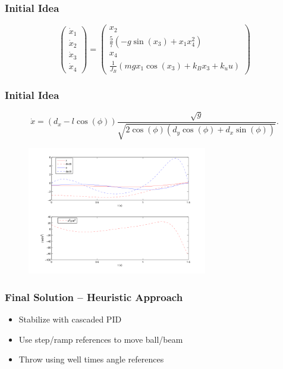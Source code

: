 \documentclass[
compress]
{beamer}
\begin{document}
\begin{frame}
\frametitle{Initial Idea}

\begin{equation*}
\begin{pmatrix}
\dot{x}_{1}\\
\dot{x}_{2}\\
\dot{x}_{3}\\
\dot{x}_{4}
\end{pmatrix}=\begin{pmatrix}x_{2}\\
\frac{5}{7}\left(-g\sin(x_{3})+x_{1}x_{4}^{2}\right)\\
x_{4}\\
\frac{1}{J_B}(mgx_{1}\cos(x_3)+k_Bx_3+k_{u}u)
\end{pmatrix}
\end{equation*}
\begin{figure}
\centering
\scalebox{0.7}{}
\end{figure}
\end{frame}

\begin{frame}
\frametitle{Initial Idea}
\[
\dot{x}=\left(d_{x}-l\cos(\phi)\right)\frac{\sqrt{g}}{\sqrt{2\cos(\phi)\left(d_{y}\cos(\phi)+d_{x}\sin(\phi)\right)}}.
\]
\begin{figure}
\includegraphics[width=0.7\textwidth]{ballbeammatlab}
\end{figure}

\end{frame}

\begin{frame}
\frametitle{Final Solution -- Heuristic Approach}
\begin{itemize}
\item Stabilize with cascaded PID
\item Use step/ramp references to move ball/beam
\item Throw using well times angle references
\end{itemize}
\end{frame}
\end{document}
